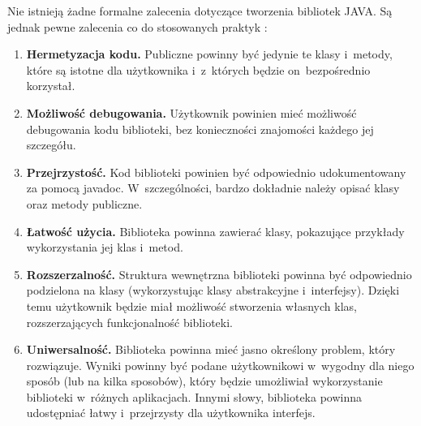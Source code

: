 Nie istnieją żadne formalne zalecenia dotyczące tworzenia bibliotek JAVA. Są jednak pewne zalecenia co do stosowanych praktyk \cite{biblioteka_standard}:
\begin{enumerate}
\item \textbf{Hermetyzacja kodu.} Publiczne powinny być jedynie te klasy i~metody, które są istotne dla użytkownika i~z~których będzie on~bezpośrednio korzystał.
\item \textbf{Możliwość debugowania.} Użytkownik powinien mieć możliwość debugowania kodu biblioteki, bez konieczności znajomości każdego jej szczegółu.
\item  \textbf{Przejrzystość.} Kod biblioteki powinien być odpowiednio udokumentowany za pomocą javadoc. W~szczególności, bardzo dokładnie należy opisać klasy oraz metody publiczne.
\item \textbf{Łatwość użycia.} Biblioteka powinna zawierać klasy, pokazujące przykłady wykorzystania jej klas i~metod.
\item \textbf{ Rozszerzalność.} Struktura wewnętrzna biblioteki powinna być odpowiednio podzielona na klasy (wykorzystując klasy abstrakcyjne i~interfejsy). Dzięki temu użytkownik będzie miał możliwość stworzenia własnych klas, rozszerzających funkcjonalność biblioteki.
\item \textbf{Uniwersalność.} Biblioteka powinna mieć jasno określony problem, który rozwiązuje. Wyniki powinny być podane użytkownikowi w~wygodny dla niego sposób (lub na kilka sposobów), 
który będzie umożliwiał wykorzystanie biblioteki w~różnych aplikacjach. Innymi słowy, biblioteka powinna udostępniać łatwy i~przejrzysty dla użytkownika interfejs.

\end{enumerate}
